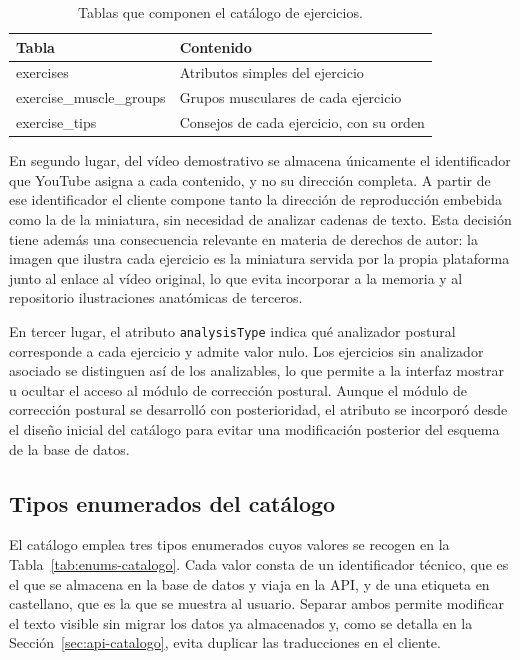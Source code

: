 \documentclass[12pt,a4paper,twoside,openright]{book}
\begin{document}
    \begin{table}[htbp]
        \centering
        \begin{tabular}{ll}
            \toprule
            \textbf{Tabla} & \textbf{Contenido} \\
            \midrule
            exercises              & Atributos simples del ejercicio \\
            exercise\_muscle\_groups & Grupos musculares de cada ejercicio \\
            exercise\_tips           & Consejos de cada ejercicio, con su orden \\
            \bottomrule
        \end{tabular}
        \caption{Tablas que componen el catálogo de ejercicios.}
        \label{tab:tablas-catalogo}
    \end{table}

    En segundo lugar, del vídeo demostrativo se almacena únicamente el
    identificador que YouTube asigna a cada contenido, y no su dirección
    completa. A partir de ese identificador el cliente compone tanto la
    dirección de reproducción embebida como la de la miniatura, sin necesidad
    de analizar cadenas de texto. Esta decisión tiene además una consecuencia
    relevante en materia de derechos de autor: la imagen que ilustra cada
    ejercicio es la miniatura servida por la propia plataforma junto al enlace
    al vídeo original, lo que evita incorporar a la memoria y al repositorio
    ilustraciones anatómicas de terceros.

    En tercer lugar, el atributo \texttt{analysisType} indica qué analizador
    postural corresponde a cada ejercicio y admite valor nulo. Los ejercicios
    sin analizador asociado se distinguen así de los analizables, lo que
    permite a la interfaz mostrar u ocultar el acceso al módulo de corrección
    postural. Aunque el módulo de corrección postural se desarrolló con
    posterioridad, el atributo se incorporó desde el diseño inicial del catálogo
    para evitar una modificación posterior del esquema de la base de datos.

    \subsection{Tipos enumerados del catálogo}

    El catálogo emplea tres tipos enumerados cuyos valores se recogen en la
    Tabla~\ref{tab:enums-catalogo}. Cada valor consta de un identificador
    técnico, que es el que se almacena en la base de datos y viaja en la API,
    y de una etiqueta en castellano, que es la que se muestra al usuario.
    Separar ambos permite modificar el texto visible sin migrar los datos ya
    almacenados y, como se detalla en la Sección~\ref{sec:api-catalogo}, evita
    duplicar las traducciones en el cliente.
\end{document}
